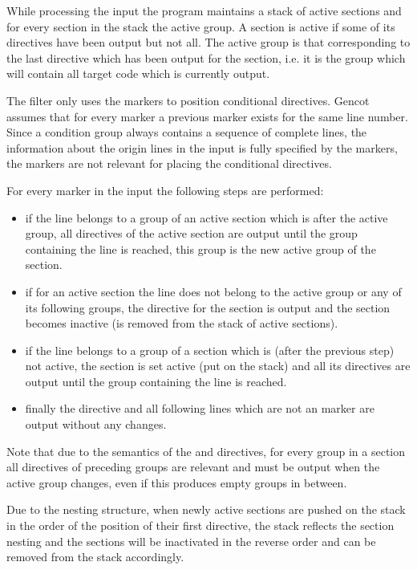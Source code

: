 While processing the input the program maintains a stack of active sections and for every section in the stack the 
active group. A section is active if some of its directives have been output but not all. The active group is that
corresponding to the last directive which has been output for the section, i.e. it is the group which will contain
all target code which is currently output.

The filter only uses the  markers to position conditional directives. Gencot assumes that for every 
 marker a previous  marker exists for the same line number. Since a condition group
always contains a sequence of complete lines, the information about the origin lines in the input is fully specified
by the  markers, the  markers are not relevant for placing the conditional directives.

For every  marker in the input the following steps are performed:
\begin{itemize}
\item if the line belongs to a group of an active section which is after the active group, all directives of the active
section are output until the group containing the line is reached, this group is the new active group of the section.
\item if for an active section the line does not belong to the active group or any of its following groups, 
the  directive for the 
section is output and the section becomes inactive (is removed from the stack of active sections).
\item if the line belongs to a group of a section which is (after the previous step) not active, the section is set 
active (put on the stack) and all its directives are output until the group containing the line is reached.
\item finally the  directive and all following lines which are not an  marker
are output without any changes.
\end{itemize}

Note that due to the semantics of the  and  directives, for every group in a section all
directives of preceding groups are relevant and must be output when the active group changes, even if this produces 
empty groups in between.

Due to the nesting structure, when newly active sections are pushed on the stack in the order of the position of their
first directive, the stack reflects the section nesting and the sections will be inactivated in the reverse order and
can be removed from the stack accordingly.

